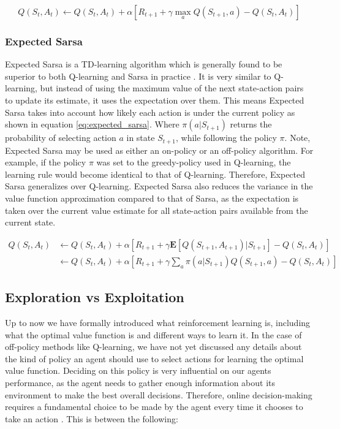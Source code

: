 \documentclass[../dissertation.tex]{subfiles}
\begin{document}
\begin{equation}
Q(S_t, A_t) \leftarrow Q(S_t, A_t) + \alpha[R_{t+1} + \gamma \max_aQ(S_{t+1}, a) - Q(S_t, A_t)]
\label{eq:q_learning}
\end{equation}

\subsubsection{Expected Sarsa}

Expected Sarsa is a TD-learning algorithm which is generally found to be superior to both Q-learning and Sarsa in practice \cite{sutton2011reinforcement}. It is very similar to Q-learning, but instead of using the maximum value of the next state-action pairs to update its estimate, it uses the expectation over them. This means Expected Sarsa takes into account how likely each action is under the current policy as shown in equation \ref{eq:expected_sarsa}. Where $\pi(a | S_{t+1})$ returns the probability of selecting action $a$ in state $S_{t+1}$, while following the policy $\pi$. Note, Expected Sarsa may be used as either an on-policy or an off-policy algorithm. For example, if the policy $\pi$ was set to the greedy-policy used in Q-learning, the learning rule would become identical to that of Q-learning. Therefore, Expected Sarsa generalizes over Q-learning. Expected Sarsa also reduces the variance in the value function approximation compared to that of Sarsa, as the expectation is taken over the current value estimate for all state-action pairs available from the current state.

\begin{align}
Q(S_t, A_t) &  \leftarrow Q(S_t, A_t) + \alpha [R_{t+1} + \gamma \mathbf{E}[Q(S_{t+1}, A_{t+1}) | S_{t+1}] - Q(S_t, A_t)] \nonumber \\
 & \leftarrow Q(S_t, A_t) + \alpha [R_{t+1} + \gamma \sum_a \pi(a| S_{t+1}) Q(S_{t+1}, a) - Q(S_t, A_t)]
 \label{eq:expected_sarsa}
\end{align}

\subsection{Exploration vs Exploitation}
\label{sec:exploration_vs_exploitation}

Up to now we have formally introduced what reinforcement learning is, including what the optimal value function is and different ways to learn it. In the case of off-policy methods like Q-learning, we have not yet discussed any details about the kind of policy an agent should use to select actions for learning the optimal value function. Deciding on this policy is very influential on our agents performance, as the agent needs to gather enough information about its environment to make the best overall decisions. Therefore, online decision-making requires a fundamental choice to be made by the agent every time it chooses to take an action \cite{exploration_vs_exploitation}. This is between the following:
\end{document}

